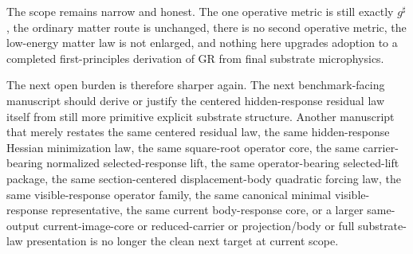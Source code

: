 \documentclass[11pt]{article}
\newcommand{\CompletedMetric}{g^{\sharp}}
\begin{document}
The scope remains narrow and honest. The one operative metric is still exactly \(\CompletedMetric\), the ordinary matter route is unchanged, there is no second operative metric, the low-energy matter law is not enlarged, and nothing here upgrades adoption to a completed first-principles derivation of GR from final substrate microphysics.

The next open burden is therefore sharper again. The next benchmark-facing manuscript should derive or justify the centered hidden-response residual law itself from still more primitive explicit substrate structure. Another manuscript that merely restates the same centered residual law, the same hidden-response Hessian minimization law, the same square-root operator core, the same carrier-bearing normalized selected-response lift, the same operator-bearing selected-lift package, the same section-centered displacement-body quadratic forcing law, the same visible-response operator family, the same canonical minimal visible-response representative, the same current body-response core, or a larger same-output current-image-core or reduced-carrier or projection/body or full substrate-law presentation is no longer the clean next target at current scope.
\end{document}

